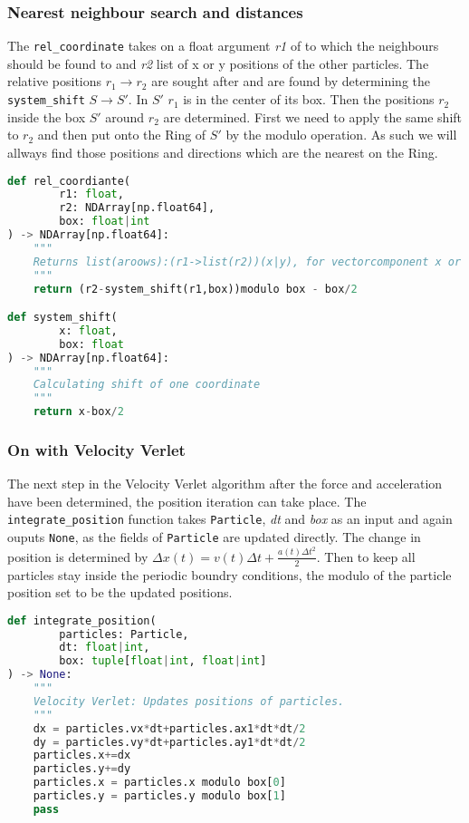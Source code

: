 \documentclass{article}
\begin{document}
\subsubsection{Nearest neighbour search and distances}
The \texttt{rel\_coordinate} takes on a float argument \textit{r1} of to which the neighbours should be found to and \textit{r2} list of x or y positions of the other particles. The relative positions $r_1\to r_2$ are sought after and are found by determining the \texttt{system\_shift} $S\to S'$. In $S'$ $r_1$ is in the center of its box. Then the positions $r_2$ inside the box $S'$ around $r_2$ are determined. First we need to apply the same shift to $r_2$ and then put onto the Ring of $S'$ by the modulo operation. As such we will allways find those positions and directions which are the nearest on the Ring.

\begin{lstlisting}[language=Python, caption= Nearest neighbour search in relative coordinates]
def rel_coordiante(
        r1: float,
        r2: NDArray[np.float64],
        box: float|int
) -> NDArray[np.float64]:  
    """ 
    Returns list(aroows):(r1->list(r2))(x|y), for vectorcomponent x or y.
    """
    return (r2-system_shift(r1,box))modulo box - box/2

def system_shift(
        x: float,
        box: float
) -> NDArray[np.float64]:
    """
    Calculating shift of one coordinate
    """
    return x-box/2   
\end{lstlisting}

\subsubsection{On with Velocity Verlet}
The next step in the Velocity Verlet algorithm after the force and acceleration have been determined, the position iteration can take place.
The \texttt{integrate\_position} function takes \texttt{Particle}, \textit{dt} and \textit{box} as an input and again ouputs \texttt{None}, as the fields of \texttt{Particle} are updated directly. The change in position is determined by $\Delta x(t)=v(t)\Delta t+\frac{a(t)\Delta t^2}{2}$. Then to keep all particles stay inside the periodic boundry conditions, the modulo of the particle position set to be the updated positions. 

\begin{lstlisting}[language=Python, caption=integrate position]
def integrate_position(
        particles: Particle,
        dt: float|int,
        box: tuple[float|int, float|int]
) -> None:
    """
    Velocity Verlet: Updates positions of particles.
    """
    dx = particles.vx*dt+particles.ax1*dt*dt/2
    dy = particles.vy*dt+particles.ay1*dt*dt/2
    particles.x+=dx 
    particles.y+=dy
    particles.x = particles.x modulo box[0]
    particles.y = particles.y modulo box[1]
    pass
\end{lstlisting}
\end{document}
